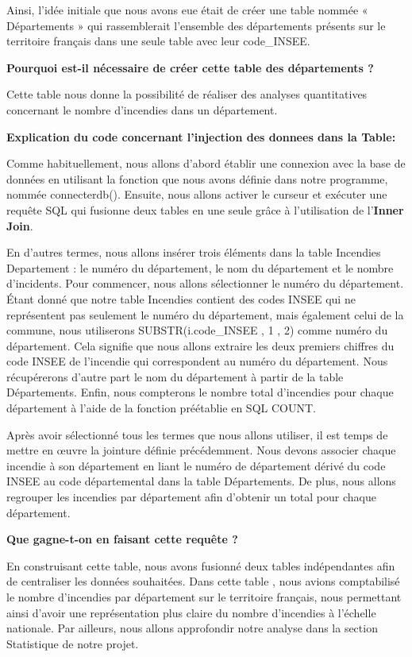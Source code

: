 \documentclass[
]{article}
\begin{document}
Ainsi, l'idée initiale que nous avons eue était de créer une table
nommée « Départements » qui rassemblerait l'ensemble des départements
présents sur le territoire français dans une seule table avec leur
code\_INSEE.

\textbf{Pourquoi est-il nécessaire de créer cette table des départements
?}

Cette table nous donne la possibilité de réaliser des analyses
quantitatives concernant le nombre d'incendies dans un département.

\textbf{Explication du code concernant l'injection des donnees dans la
Table:}

Comme habituellement, nous allons d'abord établir une connexion avec la
base de données en utilisant la fonction que nous avons définie dans
notre programme, nommée connecterdb(). Ensuite, nous allons activer le
curseur et exécuter une requête SQL qui fusionne deux tables en une
seule grâce à l'utilisation de l'\textbf{Inner Join}.

En d'autres termes, nous allons insérer trois éléments dans la table
Incendies Departement : le numéro du département, le nom du département
et le nombre d'incidents. Pour commencer, nous allons sélectionner le
numéro du département. Étant donné que notre table Incendies contient
des codes INSEE qui ne représentent pas seulement le numéro du
département, mais également celui de la commune, nous utiliserons
SUBSTR(i.code\_INSEE , 1 , 2) comme numéro du département. Cela signifie
que nous allons extraire les deux premiers chiffres du code INSEE de
l'incendie qui correspondent au numéro du département. Nous récupérerons
d'autre part le nom du département à partir de la table Départements.
Enfin, nous compterons le nombre total d'incendies pour chaque
département à l'aide de la fonction préétablie en SQL COUNT.

Après avoir sélectionné tous les termes que nous allons utiliser, il est
temps de mettre en œuvre la jointure définie précédemment. Nous devons
associer chaque incendie à son département en liant le numéro de
département dérivé du code INSEE au code départemental dans la table
Départements. De plus, nous allons regrouper les incendies par
département afin d'obtenir un total pour chaque département.

\textbf{Que gagne-t-on en faisant cette requête ?}

En construisant cette table, nous avons fusionné deux tables
indépendantes afin de centraliser les données souhaitées. Dans cette
table , nous avions comptabilisé le nombre d'incendies par département
sur le territoire français, nous permettant ainsi d'avoir une
représentation plus claire du nombre d'incendies à l'échelle nationale.
Par ailleurs, nous allons approfondir notre analyse dans la section
Statistique de notre projet.
\end{document}
